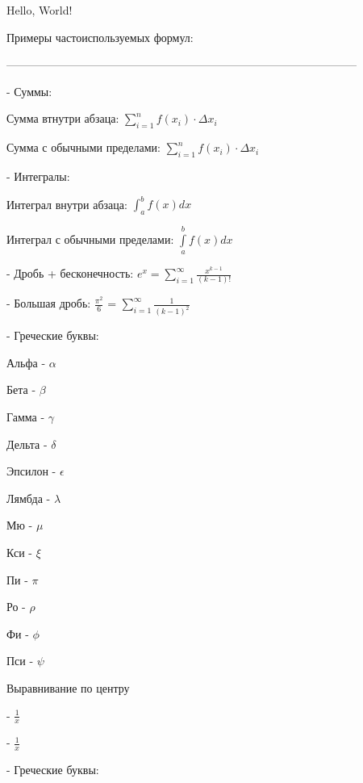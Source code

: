 \documentclass[12pt]{article}
\begin{document}
Hello, World!


Примеры частоиспользуемых формул:

---------------------------------------------------------------------------------------------

- Суммы:
\begin{itemize}
{
\setlength{\leftskip}{5em}
\item Сумма втнутри абзаца: $\sum_{i=1}^n f(x_i)\cdot\Delta x_i$
\item Сумма с обычными пределами: $\sum\limits_{i=1}^n f(x_i)\!\cdot\!\Delta x_i$

}
\end{itemize}


- Интегралы:
\begin{itemize}
{
\setlength{\leftskip}{5em}
\item Интеграл внутри абзаца: $\int_a^b f(x)dx$
\item Интеграл с обычными пределами: $\int\limits_a^b f(x)dx$

}
\end{itemize}


- Дробь + бесконечность: $e^x = \sum\limits_{i=1}^\infty \frac{x^{k-1}}{(k-1)!}$

- Большая дробь: $\displaystyle{\frac{\pi^2}{6}}$ = $\sum\limits_{i=1}^\infty \displaystyle{\frac{1}{(k-1)^2}}$

- Греческие буквы:
\begin{itemize}
{
\setlength{\leftskip}{5em}
\item Альфа - $\alpha$
\item Бета - $\beta$
\item Гамма - $\gamma$
\item Дельта - $\delta$
\item Эпсилон - $\epsilon$
\item Лямбда - $\lambda$
\item Мю - $\mu$
\item Кси - $\xi$
\item Пи - $\pi$
\item Ро - $\rho$
\item Фи - $\phi$
\item Пси - $\psi$

}



\centerline{Выравнивание по центру}


- $\displaystyle{\frac{1}{x}}$

- $\frac{1}{x}$


- Греческие буквы:
\end{itemize}
\end{document}
